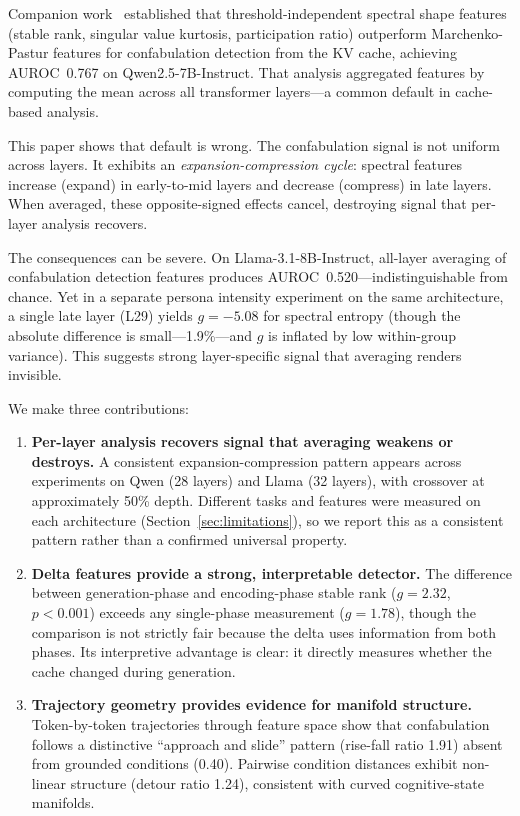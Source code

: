 \documentclass[11pt,a4paper]{article}
\begin{document}
Companion work~\citep{lyra_spectral} established that
threshold-independent spectral shape features (stable rank, singular
value kurtosis, participation ratio) outperform Marchenko-Pastur
features for confabulation detection from the KV cache, achieving
AUROC~0.767 on Qwen2.5-7B-Instruct. That analysis aggregated
features by computing the mean across all transformer layers---a
common default in cache-based analysis.

This paper shows that default is wrong. The confabulation signal is
not uniform across layers. It exhibits an \emph{expansion-compression
  cycle}: spectral features increase (expand) in early-to-mid layers
and decrease (compress) in late layers. When averaged, these
opposite-signed effects cancel, destroying signal that per-layer
analysis recovers.

The consequences can be severe. On Llama-3.1-8B-Instruct, all-layer
averaging of confabulation detection features produces
AUROC~0.520---indistinguishable from chance. Yet in a separate persona
intensity experiment on the same architecture, a single late layer
(L29) yields $g = -5.08$ for spectral entropy (though the absolute
difference is small---1.9\%---and $g$ is inflated by low
within-group variance). This suggests strong layer-specific signal
that averaging renders invisible.

We make three contributions:

\begin{enumerate}
\item \textbf{Per-layer analysis recovers signal that averaging
    weakens or destroys.} A consistent expansion-compression pattern
  appears across experiments on Qwen (28 layers) and Llama (32
  layers), with crossover at approximately 50\% depth. Different
  tasks and features were measured on each architecture
  (Section~\ref{sec:limitations}), so we report this as a consistent
  pattern rather than a confirmed universal property.

\item \textbf{Delta features provide a strong, interpretable
    detector.} The difference between generation-phase and
  encoding-phase stable rank ($g = 2.32$, $p < 0.001$) exceeds any
  single-phase measurement ($g = 1.78$), though the comparison is not
  strictly fair because the delta uses information from both phases.
  Its interpretive advantage is clear: it directly measures whether
  the cache changed during generation.

\item \textbf{Trajectory geometry provides evidence for manifold
    structure.} Token-by-token trajectories through feature space show
  that confabulation follows a distinctive ``approach and slide''
  pattern (rise-fall ratio 1.91) absent from grounded conditions
  (0.40). Pairwise condition distances exhibit non-linear structure
  (detour ratio 1.24), consistent with curved cognitive-state
  manifolds.
\end{enumerate}
\end{document}

